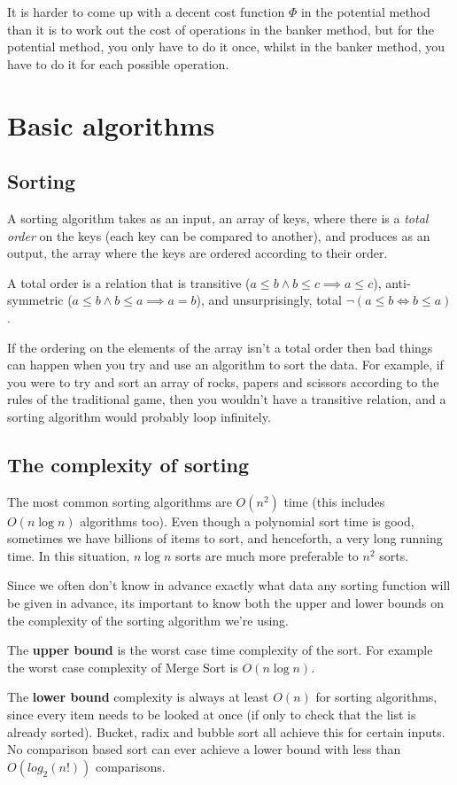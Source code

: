 It is harder to come up with a decent cost function $\Phi$ in the potential
method than it is to work out the cost of operations in the banker method, but
for the potential method, you only have to do it once, whilst in the banker
method, you have to do it for each possible operation.

\section{Basic algorithms}

\subsection{Sorting}

A sorting algorithm takes as an input, an array of keys, where there is a
\textit{total order} on the keys (each key can be compared to another), and
produces as an output, the array where the keys are ordered according to their
order.

A total order is a relation that is transitive ($a \leq b \wedge b \leq c
\implies a \leq c$), anti-symmetric ($a \leq b \wedge b \leq a \implies a = b$),
and unsurprisingly, total $\neg(a \leq b \Leftrightarrow b \leq a)$.

If the ordering on the elements of the array isn't a total order then bad
things can happen when you try and use an algorithm to sort the data. For
example, if you were to try and sort an array of rocks, papers and scissors
according to the rules of the traditional game, then you wouldn't have a
transitive relation, and a sorting algorithm would probably loop infinitely.

\subsection{The complexity of sorting}

The most common sorting algorithms are $O(n^2)$ time (this includes $O(n
\log{n})$ algorithms too). Even though a polynomial sort time is good, sometimes
we have billions of items to sort, and henceforth, a very long running time. In
this situation, $n \log{n}$ sorts are much more preferable to $n^2$ sorts.

Since we often don't know in advance exactly what data any sorting function will
be given in advance, its important to know both the upper and lower bounds on
the complexity of the sorting algorithm we're using.

\begin{description}
  \item The \textbf{upper bound} is the worst case time complexity of the
  sort. For example the worst case complexity of Merge Sort is $O(n \log{n})$.

  \item The \textbf{lower bound} complexity is always at least $O(n)$ for
  sorting algorithms, since every item needs to be looked at once (if only to
  check that the list is already sorted). Bucket, radix and bubble sort all
  achieve this for certain inputs. No comparison based sort can ever achieve
  a lower bound with less than $O(log_2(n!))$ comparisons.
\end{description}

